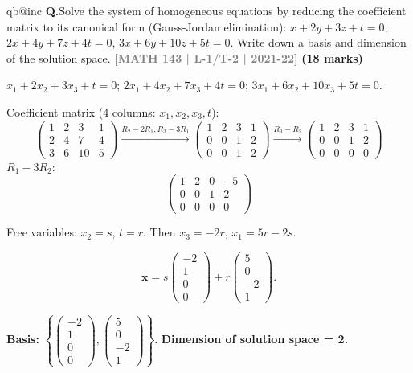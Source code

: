 \documentclass[12pt,a3paper]{article}
\makeatletter
\newcommand{\yr}[1]{\hfill\textcolor{gray}{\small\textbf{[#1]}}}
\newcommand{\mk}[1]{\textcolor{orange!70!black}{\small\textbf{(#1 marks)}}}
\newcounter{qnum}
\newcommand{\Q}[1]{%
  \csname qb@inc\endcsname
  \needspace{4\baselineskip}
  \refstepcounter{qnum}
  \vspace{6pt}
  \noindent\textbf{Q\theqnum.}\enspace #1\par
}
\makeatother
\begin{document}
\Q{Solve the system of homogeneous equations by reducing the coefficient matrix to its canonical form (Gauss-Jordan elimination):
$x + 2y + 3z + t = 0$, $2x + 4y + 7z + 4t = 0$, $3x + 6y + 10z + 5t = 0$.
Write down a basis and dimension of the solution space.
\yr{MATH 143 | L-1/T-2 | 2021-22} \mk{18}}

\begin{tcolorbox}[enhanced,breakable,
  colback=cB!4,colframe=cB,boxrule=0.8pt,arc=5pt,
  title={\textbf{Answer --- Homogeneous System: Basis \& Dimension of Solution Space}},
  fonttitle=\bfseries\color{white},colbacktitle=cB]

$x_1+2x_2+3x_3+t=0$;\; $2x_1+4x_2+7x_3+4t=0$;\; $3x_1+6x_2+10x_3+5t=0$.

Coefficient matrix (4 columns: $x_1,x_2,x_3,t$):
\[
\begin{pmatrix}1&2&3&1\\2&4&7&4\\3&6&10&5\end{pmatrix}
\xrightarrow{R_2-2R_1,R_3-3R_1}
\begin{pmatrix}1&2&3&1\\0&0&1&2\\0&0&1&2\end{pmatrix}
\xrightarrow{R_3-R_2}
\begin{pmatrix}1&2&3&1\\0&0&1&2\\0&0&0&0\end{pmatrix}
\]
$R_1-3R_2$:
\[
\begin{pmatrix}1&2&0&-5\\0&0&1&2\\0&0&0&0\end{pmatrix}
\]

Free variables: $x_2=s$, $t=r$. Then $x_3=-2r$, $x_1=5r-2s$.

\[
\mathbf{x}=s\begin{pmatrix}-2\\1\\0\\0\end{pmatrix}+r\begin{pmatrix}5\\0\\-2\\1\end{pmatrix}.
\]

\textbf{Basis:} $\left\{\begin{pmatrix}-2\\1\\0\\0\end{pmatrix},\begin{pmatrix}5\\0\\-2\\1\end{pmatrix}\right\}$.
\quad\textbf{Dimension of solution space = 2.}

\end{tcolorbox}
\end{document}
